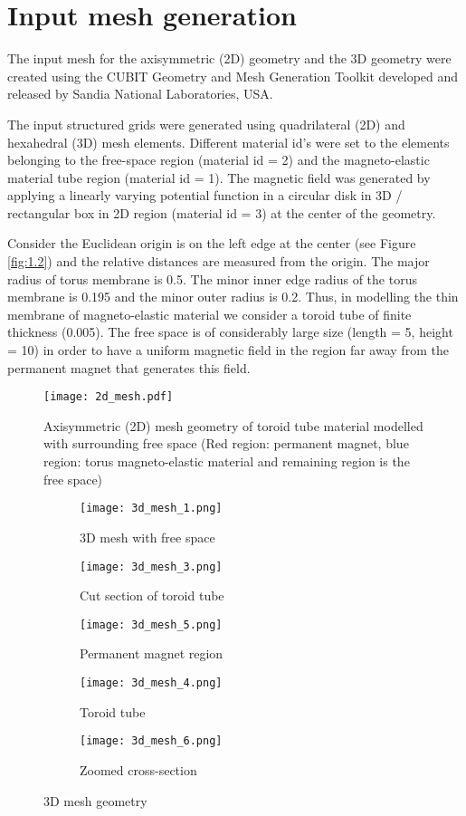 \section{Input mesh generation}
The input mesh for the axisymmetric (2D) geometry and the 3D geometry were created using the CUBIT Geometry and Mesh Generation Toolkit \cite{cubit} developed and released by Sandia National Laboratories, USA. \par 

The input structured grids were generated using quadrilateral (2D) and hexahedral (3D) mesh elements. Different material id's were set to the elements belonging to the free-space region (material id = 2) and the magneto-elastic material tube region (material id = 1). The magnetic field was generated by applying a linearly varying potential function in a circular disk in 3D / rectangular box in 2D region (material id = 3) at the center of the geometry. \par 

Consider the Euclidean origin is on the left edge at the center (see Figure \eqref{fig:1.2}) and the relative distances are measured from the origin. The major radius of torus membrane is 0.5. The minor inner edge radius of the torus membrane is 0.195 and the minor outer radius is 0.2. Thus, in modelling the thin membrane of magneto-elastic material we consider a toroid tube of finite thickness (0.005). The free space is of considerably large size (length = 5, height = 10) in order to have a uniform magnetic field in the region far away from the permanent magnet that generates this field. \par 

\begin{figure}[h]
\centering
\texttt{[image: 2d\_mesh.pdf]}
\caption{Axisymmetric (2D) mesh geometry of toroid tube material modelled with surrounding free space (Red region: permanent magnet, blue region: torus magneto-elastic material and remaining region is the free space)}
\label{fig:1.2}
\end{figure}

\begin{figure}[htb]
\centering
\begin{subfigure}[b]{0.39\textwidth}
\centering
\texttt{[image: 3d\_mesh\_1.png]}
\caption{3D mesh with free space}
\label{fig:1.3.1}
\end{subfigure}
\begin{subfigure}[b]{0.29\textwidth}
\centering
\texttt{[image: 3d\_mesh\_3.png]}
\label{fig:1.3.2}
\caption{Cut section of toroid tube}
\texttt{[image: 3d\_mesh\_5.png]}
\caption{Permanent magnet region}
\label{fig:1.3.4}
\end{subfigure}
\begin{subfigure}[b]{0.29\textwidth}
\centering
\texttt{[image: 3d\_mesh\_4.png]}
\caption{Toroid tube}
\label{fig:1.3.3}
\texttt{[image: 3d\_mesh\_6.png]}
\caption{Zoomed cross-section}
\label{fig:1.3.5}
\end{subfigure}
\caption{3D mesh geometry}
\label{fig:1.3}
\end{figure}

